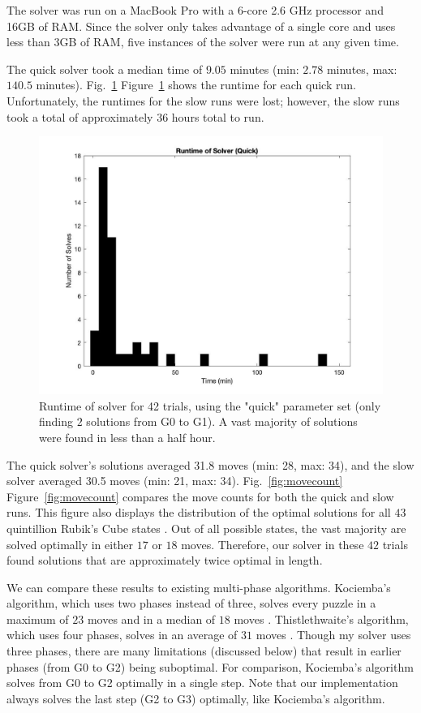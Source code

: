 \documentclass{article}
\newcommand{\fref}[2][]{%
  \ifthenelse{\equal{#1}{}}%
	{Fig.~\ref{fig:#2}}%
	{Figure~\ref{fig:#2}}}
\begin{document}
The solver was run on a MacBook Pro with a 6-core 2.6 GHz processor and 16GB of RAM. Since the solver only takes advantage of a single core and uses less than $3$GB of RAM, five instances of the solver were run at any given time.

The quick solver took a median time of $9.05$ minutes (min: $2.78$ minutes, max: $140.5$ minutes). \fref{runtime} shows the runtime for each quick run. Unfortunately, the runtimes for the slow runs were lost; however, the slow runs took a total of approximately $36$ hours total to run.

\begin{figure}
	\centering
    \includegraphics[width=6in]{runtime.jpg}
	\caption{Runtime of solver for 42 trials, using the "quick" parameter set (only finding $2$ solutions from G0 to G1). A vast majority of solutions were found in less than a half hour.}
	\label{fig:runtime}
\end{figure}

The quick solver's solutions averaged 31.8 moves (min: 28, max: 34), and the slow solver averaged 30.5 moves (min: 21, max: 34). \fref{movecount} compares the move counts for both the quick and slow runs. This figure also displays the distribution of the optimal solutions for all $43$ quintillion Rubik's Cube states \cite{god}. Out of all possible states, the vast majority are solved optimally in either $17$ or $18$ moves. Therefore, our solver in these $42$ trials found solutions that are approximately twice optimal in length. 

We can compare these results to existing multi-phase algorithms. Kociemba's algorithm, which uses two phases instead of three, solves every puzzle in a maximum of $23$ moves and in a median of $18$ moves \cite{kociemba-dist}. Thistlethwaite's algorithm, which uses four phases, solves in an average of $31$ moves \cite{thistle-dist}. Though my solver uses three phases, there are many limitations (discussed below) that result in earlier phases (from G0 to G2) being suboptimal. For comparison, Kociemba's algorithm solves from G0 to G2 optimally in a single step. Note that our implementation always solves the last step (G2 to G3) optimally, like Kociemba's algorithm.
\end{document}
